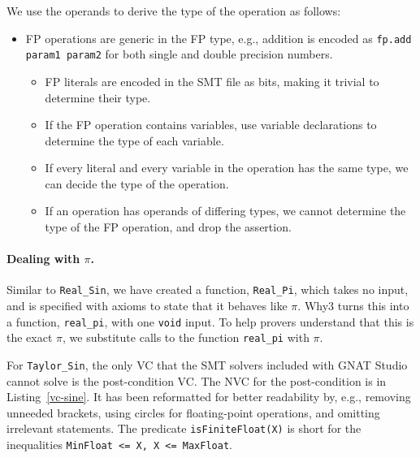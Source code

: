 \documentclass[runningheads]{llncs}
\begin{document}
We use the operands to derive the type of the operation as follows:
\begin{itemize}
  \item FP operations are generic in the FP type, e.g., addition is encoded as \lstinline{fp.add param1 param2} for both single and double precision numbers. 
  \begin{itemize}
    \item FP literals are encoded in the SMT file as bits, making it trivial to determine their type.
    \item If the FP operation contains variables, use variable declarations to determine the type of each variable.
    \item If every literal and every variable in the operation has the same type, we can decide the type of the operation.
    \item If an operation has operands of differing types, we cannot determine the type of the FP operation, and drop the assertion. 
  \end{itemize}
\end{itemize}

\paragraph*{Dealing with $\pi$.}

Similar to \lstinline{Real_Sin}, we have created a function, \lstinline{Real_Pi}, which takes no input, and is specified with axioms to state that it behaves like $\pi$.
Why3 turns this into a function, \lstinline{real_pi}, with one \lstinline{void} input.
To help provers understand that this is the exact $\pi$, we substitute calls to the function \lstinline{real_pi} with $\pi$.

For \lstinline{Taylor_Sin}, the only VC that the SMT solvers included with GNAT Studio cannot solve is the post-condition VC.
The NVC for the post-condition is in Listing~\ref{vc-sine}.
It has been reformatted for better readability by, e.g., removing unneeded brackets, using circles for floating-point operations, and omitting irrelevant statements. %
The predicate \lstinline{isFiniteFloat(X)} is short for the inequalities \lstinline{MinFloat <= X, X <= MaxFloat}.
\end{document}

